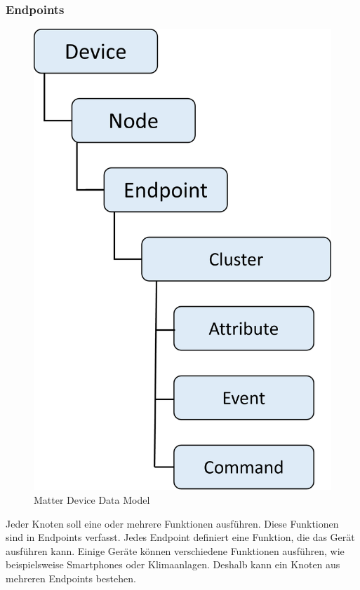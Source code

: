 \documentclass[12pt, a4paper]{article}
\begin{document}
\subsubsection{Endpoints}
\begin{figure}
  \centering
  \includegraphics[scale=0.5]{ddm}
  \caption{Matter Device Data Model}
  \label{Matter Device Data Model}
\end{figure}
\par Jeder Knoten soll eine oder mehrere Funktionen ausführen. Diese Funktionen sind in Endpoints verfasst. Jedes Endpoint definiert eine Funktion, die das Gerät ausführen kann. Einige Geräte können verschiedene Funktionen ausführen, wie beispielsweise Smartphones oder Klimaanlagen. Deshalb kann ein Knoten aus mehreren Endpoints bestehen. 
\end{document}
